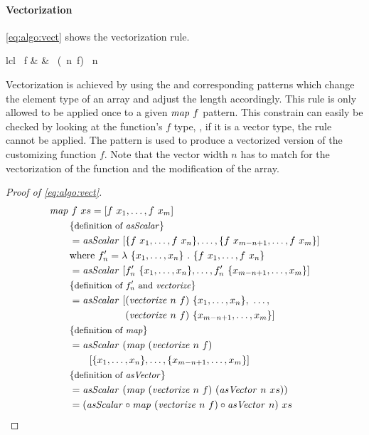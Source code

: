 \paragraph{Vectorization}
\autoref{eq:algo:vect} shows the vectorization rule.
%
\begin{rerule}{lcl}
  \map\ f
    & \rightarrow &
      \asScalar
        \circ \map\ (\vect\ n\ f)
        \circ \asVector\ n
  \label{eq:algo:vect}
\end{rerule}
%
Vectorization is achieved by using the \asVector and corresponding \asScalar patterns which change the element type of an array and adjust the length accordingly.
This rule is only allowed to be applied once to a given $\text{\textit{map}}\ f$ pattern.
This constrain can easily be checked by looking at the function's $f$ type, \ie, if it is a vector type, the rule cannot be applied.
The \vect pattern is used to produce a vectorized version of the customizing function $f$.
Note that the vector width $n$ has to match for the vectorization of the function and the modification of the array.

\begin{proof}[Proof of \autoref{eq:algo:vect}]
  \begin{align*}
    &\map\ f\ xs = [f\ x_1, \ldots, f\ x_m]\\
    &\qquad \comment{definition of \asScalar}\\
    &\qquad = \asScalar\ [\{f\ x_1, \ldots, f\ x_n\}, \ldots ,\{f\ x_{m-n+1}, \ldots, f\ x_m\}]\\
    &\qquad \text{where } f'_n = \lambda\ \{x_1, \ldots, x_n\}\ .\ \{f\ x_1, \ldots, f\ x_n\}\\
    &\qquad = \asScalar\ [f'_n\ \{x_1, \ldots, x_n\}, \ldots ,f'_n\ \{x_{m-n+1}, \ldots, x_m\}]\\
    &\qquad \comment{definition of $f'_n$ and \vect}\\
    &\qquad = \asScalar\
      \begin{aligned}[t]
        [&(\vect\ n\ f)\ \{x_1, \ldots, x_n\},\ \ldots ,\\
         &(\vect\ n\ f)\ \{x_{m-n+1}, \ldots, x_m\}]
      \end{aligned}\\
    &\qquad \comment{definition of \map}\\
    &\qquad = \asScalar\ (\map\ (\vect\ n\ f)\\
    &\qquad\qquad [\{x_1, \ldots, x_n\}, \ldots ,\{x_{m-n+1}, \ldots, x_m\}]\\
    &\qquad \comment{definition of \asVector}\\
    &\qquad = \asScalar\ (\map\ (\vect\ n\ f)\ (\asVector\ n\ xs))\\
    &\qquad = (\asScalar \circ \map\ (\vect\ n\ f) \circ \asVector\ n)\ xs
  \end{align*}
\end{proof}

